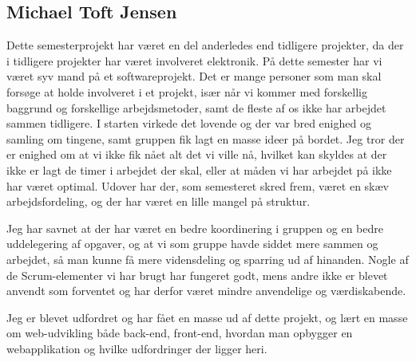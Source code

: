 \subsection*{Michael Toft Jensen}
Dette semesterprojekt har været en del anderledes end tidligere projekter, da der i tidligere projekter har været involveret elektronik. På dette semester har vi været syv mand på et softwareprojekt. Det er mange personer som man skal forsøge at holde involveret i et projekt, især når vi kommer med forskellig baggrund og forskellige arbejdsmetoder, samt de fleste af os ikke har arbejdet sammen tidligere.
I starten virkede det lovende og der var bred enighed og samling om tingene, samt gruppen fik lagt en masse ideer på bordet. Jeg tror der er enighed om at vi ikke fik nået alt det vi ville nå, hvilket kan skyldes at der ikke er lagt de timer i arbejdet der skal, eller at måden vi har arbejdet på ikke har været optimal.
Udover har der, som semesteret skred frem, været en skæv arbejdsfordeling, og der har været en lille mangel på struktur.

Jeg har savnet at der har været en bedre koordinering i gruppen og en bedre uddelegering af opgaver, og at vi som gruppe havde siddet mere sammen og arbejdet, så man kunne få mere vidensdeling og sparring ud af hinanden. Nogle af de Scrum-elementer vi har brugt har fungeret godt, mens andre ikke er blevet anvendt som forventet og har derfor været mindre anvendelige og værdiskabende.

Jeg er blevet udfordret og har fået en masse ud af dette projekt, og lært en masse om web-udvikling både back-end, front-end, hvordan man opbygger en webapplikation og hvilke udfordringer der ligger heri.